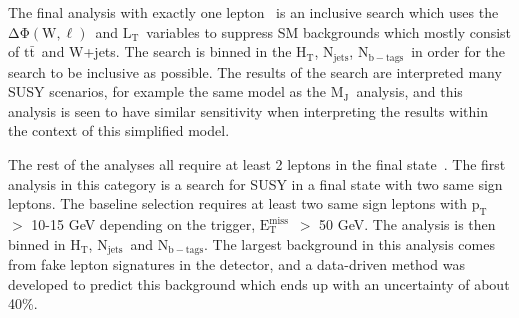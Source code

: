 \documentclass{article}
\newcommand{\MET}{${\mathrm{E_{T}^{miss}}}$}
\newcommand{\pt}{${\mathrm{p_{T}}}$}
\newcommand{\ttbar}{${\mathrm{t\bar{t}}}$}
\newcommand{\HT}{$\mathrm{H_T}$}
\newcommand{\MJ}{$\mathrm{M_J}$}
\newcommand{\LT}{$\mathrm{L_T}$}
\newcommand{\dphiwl}{$\mathrm{\Delta\Phi(W, \ell)}$}
\newcommand{\njets}{$\mathrm{N_{jets}}$}
\newcommand{\nbtags}{$\mathrm{N_{b-tags}}$}
\begin{document}


The final analysis with exactly one lepton~\cite{1lincl2015} is an inclusive search
which uses the \dphiwl\ and \LT\ variables to suppress SM backgrounds which mostly consist of \ttbar\ and W+jets.
The search is binned in the \HT, \njets, \nbtags\ in order for the search to be inclusive as possible.
The results of the search are interpreted many SUSY scenarios, for example the same model as the \MJ\ analysis,
and this analysis is seen to have similar sensitivity when interpreting the results within the context of this simplified model.








The rest of the analyses all require at least 2 leptons in the final state~\cite{ssdilep2015}.
The first analysis in this category is a search for SUSY in a final state with two same sign leptons.
The baseline selection requires at least two same sign leptons with \pt\ $>$ 10-15 GeV depending on the trigger, \MET\ $>$ 50 GeV.
The analysis is then binned in \HT, \njets\ and \nbtags.
The largest background in this analysis comes from fake lepton signatures in the detector,
and a data-driven method was developed to predict this background which ends up with an uncertainty of about 40\%.
\end{document}
